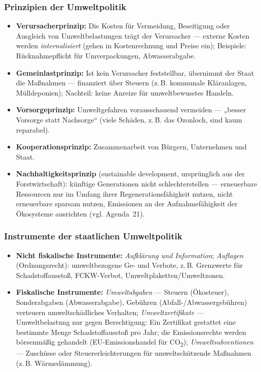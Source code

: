 \documentclass[11pt, a4paper]{article}
\begin{document}
\subsubsection{Prinzipien der Umweltpolitik}

\begin{itemize}
  \item \textbf{Verursacherprinzip:} Die Kosten für Vermeidung, Beseitigung oder Ausgleich
    von Umweltbelastungen trägt der Verursacher --- externe Kosten werden
    \emph{internalisiert} (gehen in Kostenrechnung und Preise ein); Beispiele:
    Rücknahmepflicht für Umverpackungen, Abwasserabgabe.
  \item \textbf{Gemeinlastprinzip:} Ist kein Verursacher feststellbar, übernimmt der Staat
    die Maßnahmen --- finanziert über Steuern (z.\,B. kommunale Kläranlagen, Mülldeponien);
    Nachteil: keine Anreize für umweltbewusstes Handeln.
  \item \textbf{Vorsorgeprinzip:} Umweltgefahren vorausschauend vermeiden --- „besser
    Vorsorge statt Nachsorge`` (viele Schäden, z.\,B. das Ozonloch, sind kaum reparabel).
  \item \textbf{Kooperationsprinzip:} Zusammenarbeit von Bürgern, Unternehmen und Staat.
  \item \textbf{Nachhaltigkeitsprinzip} (sustainable development, ursprünglich aus der
    Forstwirtschaft): künftige Generationen nicht schlechterstellen --- erneuerbare
    Ressourcen nur im Umfang ihrer Regenerationsfähigkeit nutzen, nicht erneuerbare sparsam
    nutzen, Emissionen an der Aufnahmefähigkeit der Ökosysteme ausrichten (vgl. Agenda~21).
\end{itemize}

\subsubsection{Instrumente der staatlichen Umweltpolitik}

\begin{itemize}
  \item \textbf{Nicht fiskalische Instrumente:} \emph{Aufklärung und Information};
    \emph{Auflagen} (Ordnungsrecht): umweltbezogene Ge- und Verbote, z.\,B. Grenzwerte für
    Schadstoffausstoß, FCKW-Verbot, Umweltplaketten/Umweltzonen.
  \item \textbf{Fiskalische Instrumente:}
    \emph{Umweltabgaben} --- Steuern (Ökosteuer), Sonderabgaben (Abwasserabgabe), Gebühren
    (Abfall-/Abwassergebühren) verteuern umweltschädliches Verhalten;
    \emph{Umweltzertifikate} --- Umweltbelastung nur gegen Berechtigung: Ein Zertifikat
    gestattet eine bestimmte Menge Schadstoffausstoß pro Jahr; die Emissionsrechte werden
    börsenmäßig gehandelt (EU-Emissionshandel für CO\textsubscript{2});
    \emph{Umweltsubventionen} --- Zuschüsse oder Steuererleichterungen für
    umweltschützende Maßnahmen (z.\,B. Wärmedämmung).
\end{itemize}
\end{document}
